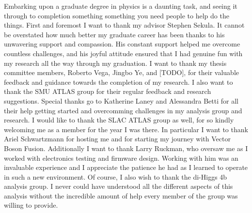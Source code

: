 
Embarking upon a graduate degree in physics is a daunting task,
    and seeing it through to completion something something you need people
    to help do the things.
First and foremost I want to thank my advisor Stephen Sekula.
It cannot be overstated how much better my graduate career has been
    thanks to his unwavering support and compassion.
His constant support helped me overcome countless challenges,
    and his joyful attitude ensured that I had genuine fun
    with my research all the way through my graduation.
I want to thank my thesis committee members,
    Roberto Vega, Jingbo Ye, and [TODO],
    for their valuable feedback and guidance towards the completion of my research.
I also want to thank the SMU ATLAS group for their regular feedback and research suggestions.
Special thanks go to Katherine Laney and Alessandra Betti %
    for all their help getting started and overcomming challenges in my analysis group and research.
I would like to thank the SLAC ATLAS group as well,
    for so kindly welcoming me as a member for the year I was there.
In particular I want to thank Ariel Schwartzmann for hosting me
    and for starting my journey with Vector Boson Fusion.
Additionally I want to thank Larry Ruckman,
    who oversaw me as I worked with electronics testing and firmware design.
Working with him was an invaluable experience
    and I appreciate the patience he had as I learned to operate in such a new environment.
Of course, I also wish to thank the di-Higgs 4b analysis group.
I never could have understood all the different aspects of this analysis without the incredible amount of help
    every member of the group was willing to provide.


